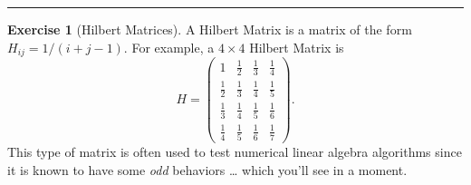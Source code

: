 \documentclass[
]{book}
\theoremstyle{definition}
\theoremstyle{definition}
\theoremstyle{definition}
\newtheorem{exercise}{Exercise}[chapter]
\theoremstyle{remark}
\begin{document}
\begin{center}\rule{0.5\linewidth}{0.5pt}\end{center}

\begin{exercise}[Hilbert Matrices]
\protect\hypertarget{exr:unnamed-chunk-391}{}{\label{exr:unnamed-chunk-391} {} }A Hilbert Matrix is a matrix of the form \(H_{ij} = 1 / (i+j-1)\). For example, a \(4 \times 4\) Hilbert Matrix is
\[ H = \begin{pmatrix} 1 & \frac{1}{2} & \frac{1}{3} & \frac{1}{4} \\
                       \frac{1}{2} & \frac{1}{3} & \frac{1}{4} & \frac{1}{5} \\ 
                       \frac{1}{3} & \frac{1}{4} & \frac{1}{5} & \frac{1}{6} \\ 
                       \frac{1}{4} & \frac{1}{5} & \frac{1}{6} & \frac{1}{7} \end{pmatrix}. \]
This type of matrix is often used to test numerical linear algebra algorithms since it is known to have some \emph{odd} behaviors \ldots{} which you'll see in a moment.


\end{exercise}
\end{document}
